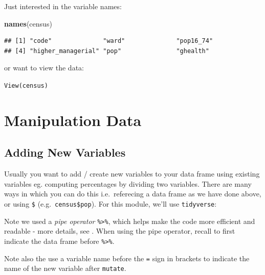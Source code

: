 \documentclass[
]{book}
\newenvironment{Shaded}{\begin{snugshade}}{\end{snugshade}}
\newcommand{\DataTypeTok}[1]{\textcolor[rgb]{0.13,0.29,0.53}{#1}}
\newcommand{\KeywordTok}[1]{\textcolor[rgb]{0.13,0.29,0.53}{\textbf{#1}}}
\newcommand{\NormalTok}[1]{#1}
\newcommand{\OperatorTok}[1]{\textcolor[rgb]{0.81,0.36,0.00}{\textbf{#1}}}
\newcommand{\StringTok}[1]{\textcolor[rgb]{0.31,0.60,0.02}{#1}}
\begin{document}
Just interested in the variable names:

\begin{Shaded}
\begin{Highlighting}[]
\KeywordTok{names}\NormalTok{(census)}
\end{Highlighting}
\end{Shaded}

\begin{verbatim}
## [1] "code"              "ward"              "pop16_74"         
## [4] "higher_managerial" "pop"               "ghealth"
\end{verbatim}

or want to view the data:

\texttt{View(census)}

\hypertarget{manipulation-data}{%
\section{Manipulation Data}\label{manipulation-data}}

\hypertarget{adding-new-variables}{%
\subsection{Adding New Variables}\label{adding-new-variables}}

Usually you want to add / create new variables to your data frame using existing variables eg. computing percentages by dividing two variables. There are many ways in which you can do this i.e.~referecing a data frame as we have done above, or using \texttt{\$} (e.g.~\texttt{census\$pop}). For this module, we'll use \texttt{tidyverse}:

\begin{Shaded}
\end{Shaded}

Note we used a \emph{pipe operator} \texttt{\%\textgreater{}\%}, which helps make the code more efficient and readable - more details, see \citet{grolemund_wickham_2019_book}. When using the pipe operator, recall to first indicate the data frame before \texttt{\%\textgreater{}\%}.

Note also the use a variable name before the \texttt{=} sign in brackets to indicate the name of the new variable after \texttt{mutate}.
\end{document}
